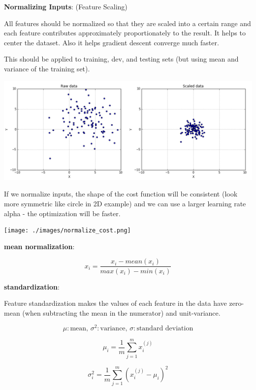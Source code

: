 \documentclass{article}
\begin{document}
\noindent \textbf{Normalizing Inputs}: (Feature Scaling)

\noindent All features should be normalized so that they are scaled into a certain range and each feature contributes approximately proportionately to the result. It helps to center the dataset. Also it helps gradient descent converge much faster.

\bigskip

\noindent This should be applied to training, dev, and testing sets (but using mean and variance of the training set).

\begin{center}
\includegraphics[scale=0.8]{./images/normalize_input.png}
\end{center}

\noindent If we normalize inputs, the shape of the cost function will be consistent (look more symmetric like circle in 2D example) and we can use a larger learning rate alpha - the optimization will be faster.

\begin{center}
\texttt{[image: ./images/normalize\_cost.png]}
\end{center}

\bigskip

\noindent \textbf{mean normalization}:

\[x_i = \frac{x_i - mean(x_i)}{max(x_i) - min(x_i)}\]

\bigskip

\noindent \textbf{standardization}:

\noindent Feature standardization makes the values of each feature in the data have zero-mean (when subtracting the mean in the numerator) and unit-variance.

\[\mu: \text{mean, } \sigma^2: \text{variance, } \sigma: \text{standard deviation}\]

\[\mu_i ={\frac {1}{m}}\sum _{j=1}^{m}x^{(j)}_{i}\]

\[\sigma^2_i = \frac{1}{m} \sum_{j = 1}^m (x^{(j)}_i - \mu_i)^2\]
\end{document}
